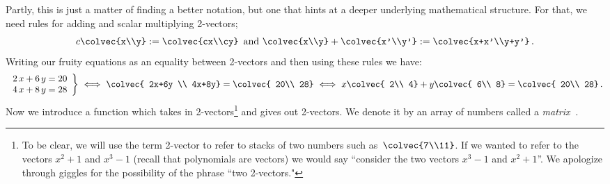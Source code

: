 %
Partly, this is just a matter of finding a better notation, but one that hints at a deeper underlying mathematical structure.
For that, we need rules for adding and scalar multiplying 2-vectors; 
$$
c\colvec{x\\y}:=\colvec{cx\\cy}\, \mbox{ and } \colvec{x\\y}+\colvec{x'\\y'}:=\colvec{x+x'\\y+y'}\, .
$$
Writing our fruity equations as an equality between 2-vectors and then using these rules we have:
\begin{equation*}
   \left.
\begin{array}{lr}
   	2\, x + 6\, y  =  20 \\
	4\, x + 8\, y  =  28
     \end{array}
   \right\} 
\ \Longleftrightarrow  \  \colvec{ 2x+6y \\ 4x+8y}  =\colvec{ 20\\ 28}
\ \Longleftrightarrow \ 
   x \colvec{ 2\\ 4} + y \colvec{ 6\\ 8} =\colvec{ 20\\ 28} \, .
\end{equation*}
Now we  introduce a function which takes in 2-vectors\footnote{To be clear, we will use the term 2-vector to refer to stacks of two numbers such as~$\colvec{7\\11}$. If we wanted to refer to the vectors $x^2+1$ and $x^3-1$ (recall that polynomials are vectors) we would say ``consider the two vectors $x^3-1$ and $x^2+1$''. We apologize through giggles for the possibility of the phrase ``two 2-vectors."} and gives out 2-vectors. We denote it by  an array of numbers  called a {\it matrix\,\! .}
